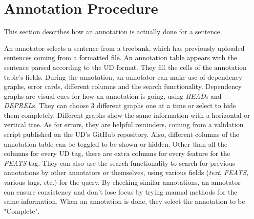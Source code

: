 \section{Annotation Procedure}
\label{sec:annotation}
This section describes how an annotation is actually done for a sentence.

An annotator selects a sentence from a treebank, which has previously uploaded sentences coming from a \conllu{} formatted file.
An annotation table appears with the sentence parsed according to the UD format.
They fill the cells of the annotation table's fields.
During the annotation, an annotator can make use of dependency graphs, error cards, different columns and the search functionality.
Dependency graphs are visual cues for how an annotation is going, using \textit{HEAD}s and \textit{DEPREL}s.
They can choose 3 different graphs one at a time or select to hide them completely.
Different graphs show the same information with a horizontal or vertical tree.
As for errors, they are helpful reminders, coming from a validation script published on the UD's GitHub repository.
Also, different columns of the annotation table can be toggled to be shown or hidden.
Other than all the columns for every UD tag, there are extra columns for every feature for the \textit{FEATS} tag.
They can also use the search functionality to search for previous annotations by other annotators or themselves, using various fields (\textit{text}, \textit{FEATS}, various tags, etc.) for the query.
By checking similar annotations, an annotator can ensure consistency and don't lose focus by trying manual methods for the same information.
When an annotation is done, they select the annotation to be "Complete".

